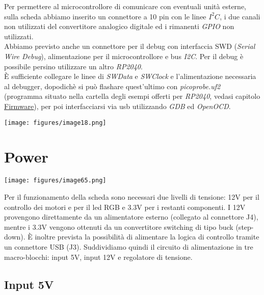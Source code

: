 \noindent Per permettere al microcontrollore di comunicare con eventuali unità
esterne, sulla scheda abbiamo inserito un connettore a 10 pin con le
linee \emph{$I^2C$}, i due canali non utilizzati del convertitore analogico
digitale ed i rimanenti \emph{GPIO} non utilizzati.\\
Abbiamo previsto anche un connettore per il debug con interfaccia SWD
(\emph{Serial Wire Debug}), alimentazione per il microcontrollore e bus
\emph{I2C}. Per il debug è possibile persino utilizzare un altro \emph{RP2040}.\\
È sufficiente collegare le linee di \emph{SWData} e
\emph{SWClock} e l'alimentazione necessaria al debugger,
dopodichè si può flashare quest'ultimo con \emph{picoprobe.uf2}
(programma situato nella cartella degli esempi offerti per \emph{RP2040},
vedasi capitolo
\protect\hyperlink{_w8kvxnysumpc}{\underline{Firmware}}), per poi
interfacciarsi via usb utilizzando \emph{GDB} ed \emph{OpenOCD}.

\begin{center}
\texttt{[image: figures/image18.png]}
\captionsetup{type=figure}
\end{center}

\hypertarget{power}{%
\section{Power}\label{power}}

\begin{center}
\texttt{[image: figures/image65.png]}
\captionsetup{type=figure}
\end{center}

\noindent Per il funzionamento della scheda sono necessari due livelli di tensione: 
12V per il controllo dei motori e per il led RGB e 3.3V per i restanti componenti. 
I 12V provengono direttamente da un alimentatore esterno (collegato al connettore J4), 
mentre i 3.3V vengono ottenuti da un convertitore switching di tipo buck (step-down). 
È inoltre prevista la possibilità di alimentare la logica di controllo tramite un connettore USB (J3). 
Suddividiamo quindi il circuito di alimentazione in tre macro-blocchi: input 5V, input 12V e regolatore di tensione.

\hypertarget{input-5V}{
\subsection{\texorpdfstring{Input 5V}{Input 5V}}\label{input-5V}}

